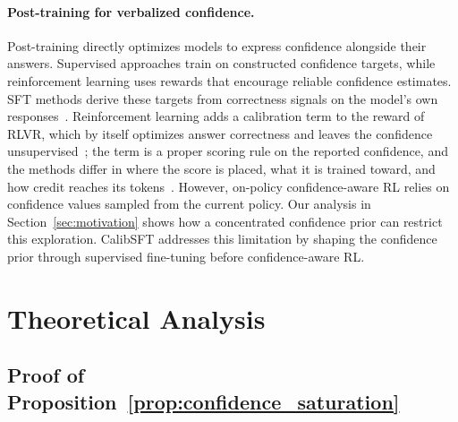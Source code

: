 \documentclass{article} %
\begin{document}
\paragraph{Post-training for verbalized confidence.}
Post-training directly optimizes models to express confidence
alongside their answers. Supervised approaches train on constructed
confidence targets, while reinforcement learning uses rewards
that encourage reliable confidence estimates.
SFT methods derive these targets from correctness signals on the model's own
responses~\citep{lin2022teaching,zhang2024rtuning,jang2025verbalized,liu2024uncertainty,xu2024sayself,hager2025uncertainty,seo2025advice,zhang2026lovec,li2025conftuner}.
Reinforcement learning adds a calibration term to the reward of RLVR, which by itself
optimizes answer correctness and leaves the confidence
unsupervised~\citep{shao2024deepseekmath,yu2025dapo}; the term is a proper scoring rule on
the reported confidence, and the methods differ in where the score is placed, what it is
trained toward, and how credit reaches its
tokens~\citep{leng2025taming,damani2026beyond,bani2026rewarding,tan2026effectiveness,li2026confidence,finlay2026caliber,shi2026sage,yu2026semantic,li2026orce,ma2026decoupling,wang2026process,yang2026scaling,zhang2026collaboration}.
However, on-policy confidence-aware RL relies on confidence values sampled
from the current policy. Our analysis in
Section~\ref{sec:motivation} shows how a concentrated confidence
prior can restrict this exploration.
CalibSFT addresses this limitation by shaping the confidence prior
through supervised fine-tuning before confidence-aware RL.

\section{Theoretical Analysis}

\subsection{Proof of Proposition~\ref{prop:confidence_saturation}}
\label{sec:confidence_saturation_proof}
\end{document}
